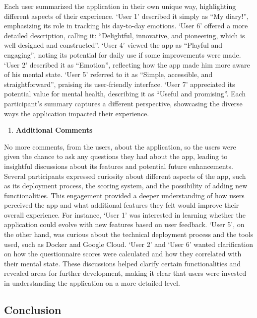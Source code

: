\noindent Each user summarized the application in their own unique way, highlighting different aspects of their experience. `User 1' described it simply as ``My diary!'', emphasizing its role in tracking his day-to-day emotions. `User 6' offered a more detailed description, calling it: ``Delightful, innovative, and pioneering, which is well designed and constructed''. `User 4' viewed the app as ``Playful and engaging'', noting its potential for daily use if some improvements were made. `User 2' described it as ``Emotion'', reflecting how the app made him more aware of his mental state. `User 5' referred to it as ``Simple, accessible, and straightforward'', praising its user-friendly interface. `User 7' appreciated its potential value for mental health, describing it as ``Useful and promising''. Each participant's summary captures a different perspective, showcasing the diverse ways the application impacted their experience.

\begin{enumerate}[resume]
    \item \textbf{Additional Comments}
\end{enumerate}

\noindent No more comments, from the users, about the application, so the users were given the chance to ask any questions they had about the app, leading to insightful discussions about its features and potential future enhancements. Several participants expressed curiosity about different aspects of the app, such as its deployment process, the scoring system, and the possibility of adding new functionalities. This engagement provided a deeper understanding of how users perceived the app and what additional features they felt would improve their overall experience. For instance, `User 1' was interested in learning whether the application could evolve with new features based on user feedback. `User 5', on the other hand, was curious about the technical deployment process and the tools used, such as Docker and Google Cloud. `User 2' and `User 6' wanted clarification on how the questionnaire scores were calculated and how they correlated with their mental state. These discussions helped clarify certain functionalities and revealed areas for further development, making it clear that users were invested in understanding the application on a more detailed level.

\subsection{Conclusion}

